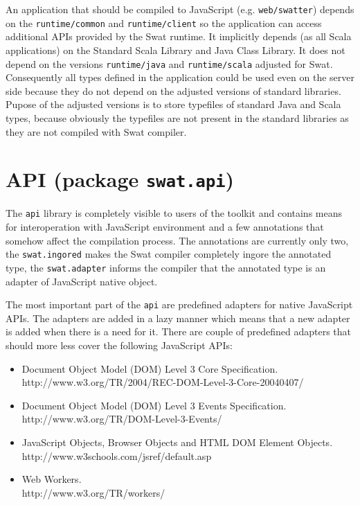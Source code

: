 \documentclass[12pt,a4paper]{report}
\begin{document}
An application that should be compiled to JavaScript (e.g. \texttt{web/swatter}) depends on the \texttt{runtime/common} and \texttt{runtime/client} so the application can access additional APIs provided by the Swat runtime. It implicitly depends (as all Scala applications) on the Standard Scala Library and Java Class Library. It does not depend on the versions \texttt{runtime/java} and \texttt{runtime/scala} adjusted for Swat. Consequently all types defined in the application could be used even on the server side because they do not depend on the adjusted versions of standard libraries. Pupose of the adjusted versions is to store typefiles of standard Java and Scala types, because obviously the typefiles are not present in the standard libraries as they are not compiled with Swat compiler.

\section{API (package \texttt{swat.api})}

The \texttt{api} library is completely visible to users of the toolkit and contains means for interoperation with JavaScript environment and a few annotations that somehow affect the compilation process. The annotations are currently only two, the \texttt{swat.ingored} makes the Swat compiler completely ingore the annotated type, the \texttt{swat.adapter} informs the compiler that the annotated type is an adapter of JavaScript native object.

The most important part of the \texttt{api} are predefined adapters for native JavaScript APIs. The adapters are added in a lazy manner which means that a new adapter is added when there is a need for it. There are couple of predefined adapters that should more less cover the following JavaScript APIs:

\begin{itemize}
\item Document Object Model (DOM) Level 3 Core Specification.\\
http://www.w3.org/TR/2004/REC-DOM-Level-3-Core-20040407/
\item Document Object Model (DOM) Level 3 Events Specification.\\
http://www.w3.org/TR/DOM-Level-3-Events/
\item JavaScript Objects, Browser Objects and HTML DOM Element Objects.\\
http://www.w3schools.com/jsref/default.asp
\item Web Workers.\\
http://www.w3.org/TR/workers/
\end{itemize}
\end{document}

